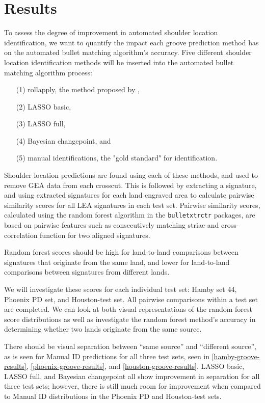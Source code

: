 \documentclass[12pt]{article}
\begin{document}
\section{Results}

To assess the degree of improvement in automated shoulder location
identification, we want to quantify the impact each groove prediction
method has on the automated bullet matching algorithm's accuracy. Five
different shoulder location identification methods will be inserted into
the automated bullet matching algorithm process:

\begin{itemize}
\item[(1)] rollapply, the method proposed by \cite{Hare1}, 
\item[(2)] LASSO basic, 
\item[(3)] LASSO full,
\item[(4)] Bayesian changepoint, and
\item[(5)] manual identifications, the "gold standard" for identification.  
\end{itemize}

Shoulder location predictions are found using each of these methods, and
used to remove GEA data from each crosscut. This is followed by
extracting a signature, and using extracted signatures for each land
engraved area to calculate pairwise similarity scores for all LEA
signatures in each test set. Pairwise similarity scores, calculated
using the random forest algorithm in the \texttt{bulletxtrctr} packages,
are based on pairwise features such as consecutively matching striae and
cross-correlation function for two aligned signatures.

Random forest scores should be high for land-to-land comparisons between
signatures that originate from the same land, and lower for land-to-land
comparisons between signatures from different lands.

We will investigate these scores for each individual test set: Hamby set
44, Phoenix PD set, and Houston-test set. All pairwise comparisons
within a test set are completed. We can look at both visual
representations of the random forest score distributions as well as
investigate the random forest method's accuracy in determining whether
two lands originate from the same source.

There should be visual separation between ``same source'' and
``different source'', as is seen for Manual ID predictions for all three
test sets, seen in \autoref{hamby-groove-results},
\autoref{phoenix-groove-results}, and \autoref{houston-groove-results}.
LASSO basic, LASSO full, and Bayesian changepoint all show improvement
in separation for all three test sets; however, there is still much room
for improvement when compared to Manual ID distributions in the Phoenix
PD and Houston-test sets.
\end{document}
